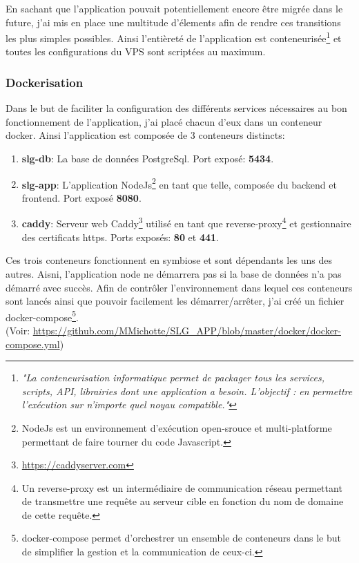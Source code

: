 \newpara

En sachant que l'application pouvait potentiellement encore être migrée dans le future, j'ai mis en place une multitude d'élements afin de rendre ces transitions les plus simples possibles. Ainsi l'entièreté de l'application est conteneurisée\footnote{\textit{"La conteneurisation informatique permet de packager tous les services, scripts, API, librairies dont une application a besoin. L’objectif : en permettre l’exécution sur n’importe quel noyau compatible."}\cite{conteneurisation}} et toutes les configurations du VPS sont scriptées au maximum. 

\subsubsection{Dockerisation}
Dans le but de faciliter la configuration des différents services nécessaires au bon fonctionnement de l'application, j'ai placé chacun d'eux dans un conteneur docker. Ainsi l'application est composée de 3 conteneurs distincts: 

\newpara

\begin{enumerate}
  \item \textbf{slg-db}: La base de données PostgreSql. Port exposé: \textbf{5434}.
  \item \textbf{slg-app}: L'application NodeJs\footnote{NodeJs est un environnement d'exécution open-srouce et multi-platforme permettant de faire tourner du code Javascript.} en tant que telle, composée du backend et frontend. Port exposé \textbf{8080}. 
  \item \textbf{caddy}: Serveur web Caddy\footnote{\url{https://caddyserver.com}} utilisé en tant que reverse-proxy\footnote{Un reverse-proxy est un intermédiaire de communication réseau permettant de transmettre une requête au serveur cible en fonction du nom de domaine de cette requête.} et gestionnaire des certificats https. Ports exposés: \textbf{80} et \textbf{441}.
\end{enumerate}

\newpage

Ces trois conteneurs fonctionnent en symbiose et sont dépendants les uns des autres. Aisni, l'application node ne démarrera pas si la base de données n'a pas démarré avec succès. Afin de contrôler l'environnement dans lequel ces conteneurs sont lancés ainsi que pouvoir facilement les démarrer/arrêter, j'ai créé un fichier docker-compose\footnote{docker-compose permet d'orchestrer un ensemble de conteneurs dans le but de simplifier la gestion et la communication de ceux-ci.}. \\ (Voir: \url{https://github.com/MMichotte/SLG_APP/blob/master/docker/docker-compose.yml})


